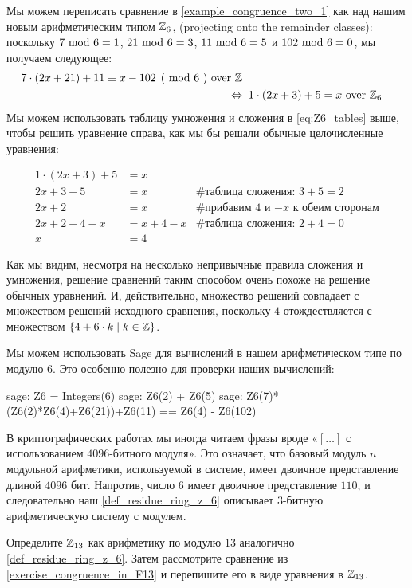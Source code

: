 \begin{example} 
Мы можем переписать сравнение в \eqref{example_congruence_two_1} как  над нашим новым арифметическим типом $\mathbb{Z}_6$,  (projecting onto the remainder classes): поскольку $7 \text{ mod } 6= 1$, $21 \text{ mod } 6= 3$, $11 \text{ mod } 6= 5$ и $102 \text{ mod } 6= 0$, мы получаем следующее:
\begin{align*}
\kongru{7\cdot(2x+21) + 11}{x-102}{6} \text{ over } \Z\\
\Leftrightarrow & \; \; 1\cdot (2x+3) + 5 = x \text{ over } \Z_6
\end{align*}
Мы можем использовать таблицу умножения и сложения в \eqref{eq:Z6_tables} выше, чтобы решить уравнение справа, как мы бы решали обычные целочисленные уравнения:

\begin{align*}
1\cdot (2x+3) + 5 &= x & \text{ }\\
2x+3 + 5 &= x & \text{\# таблица сложения: } 3+5 = 2 \\
2x+2 &= x & \text{\# прибавим 4 и $-x$ к обеим сторонам} \\
2x+2 +4 -x &= x + 4 -x & \text{\# таблица сложения: } 2+4 = 0 \\
x &= 4 &
\end{align*}

Как мы видим, несмотря на несколько непривычные правила сложения и умножения, решение сравнений таким способом очень похоже на решение обычных уравнений. И, действительно, множество решений совпадает с множеством решений исходного сравнения, поскольку $4$ отождествляется с множеством $\{4+6\cdot k\;|\; k\in\mathbb{Z}\}$.

Мы можем использовать Sage для вычислений в нашем арифметическом типе по модулю $6$. Это особенно полезно для проверки наших вычислений:
\begin{sagecommandline}
sage: Z6 = Integers(6)
sage: Z6(2) + Z6(5)
sage: Z6(7)*(Z6(2)*Z6(4)+Z6(21))+Z6(11) == Z6(4) - Z6(102)
\end{sagecommandline}
\end{example}

\begin{remark} В криптографических работах мы иногда читаем фразы вроде «$[\ldots]$ с использованием $4096$-битного модуля». Это означает, что базовый модуль $n$ модульной арифметики, используемой в системе, имеет двоичное представление длиной $4096$ бит. Напротив, число $6$ имеет двоичное представление $110$, и следовательно наш \examplename{} \ref{def_residue_ring_z_6}
 описывает $3$-битную арифметическую систему с модулем.
\end{remark}
\begin{exercise}
Определите $\mathbb{Z}_{13}$ как арифметику по модулю $13$ аналогично \examplename{} \ref{def_residue_ring_z_6}. Затем рассмотрите сравнение из \exercisename{} \ref{exercise_congruence_in_F13} и перепишите его в виде уравнения в $\mathbb{Z}_{13}$.
\end{exercise}


